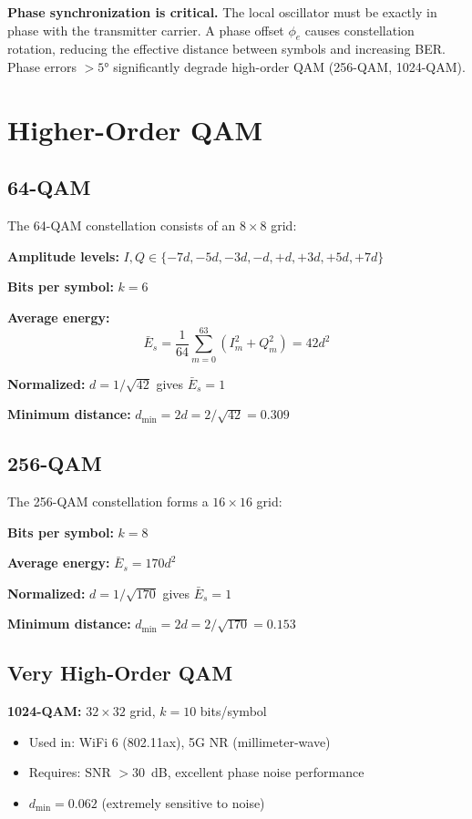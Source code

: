 \begin{warningbox}
\textbf{Phase synchronization is critical.} The local oscillator must be exactly in phase with the transmitter carrier. A phase offset $\phi_e$ causes constellation rotation, reducing the effective distance between symbols and increasing BER. Phase errors $> 5°$ significantly degrade high-order QAM (256-QAM, 1024-QAM).
\end{warningbox}

\section{Higher-Order QAM}

\subsection{64-QAM}

The 64-QAM constellation consists of an $8 \times 8$ grid:

\textbf{Amplitude levels:} $I, Q \in \{-7d, -5d, -3d, -d, +d, +3d, +5d, +7d\}$

\textbf{Bits per symbol:} $k = 6$

\textbf{Average energy:}
\begin{equation}
\bar{E}_s = \frac{1}{64}\sum_{m=0}^{63} (I_m^2 + Q_m^2) = 42d^2
\end{equation}

\textbf{Normalized:} $d = 1/\sqrt{42}$ gives $\bar{E}_s = 1$

\textbf{Minimum distance:} $d_{\min} = 2d = 2/\sqrt{42} = 0.309$

\subsection{256-QAM}

The 256-QAM constellation forms a $16 \times 16$ grid:

\textbf{Bits per symbol:} $k = 8$

\textbf{Average energy:} $\bar{E}_s = 170d^2$

\textbf{Normalized:} $d = 1/\sqrt{170}$ gives $\bar{E}_s = 1$

\textbf{Minimum distance:} $d_{\min} = 2d = 2/\sqrt{170} = 0.153$

\subsection{Very High-Order QAM}

\textbf{1024-QAM:} $32 \times 32$ grid, $k = 10$ bits/symbol
\begin{itemize}
\item Used in: WiFi 6 (802.11ax), 5G NR (millimeter-wave)
\item Requires: SNR $> 30$~dB, excellent phase noise performance
\item $d_{\min} = 0.062$ (extremely sensitive to noise)
\end{itemize}

